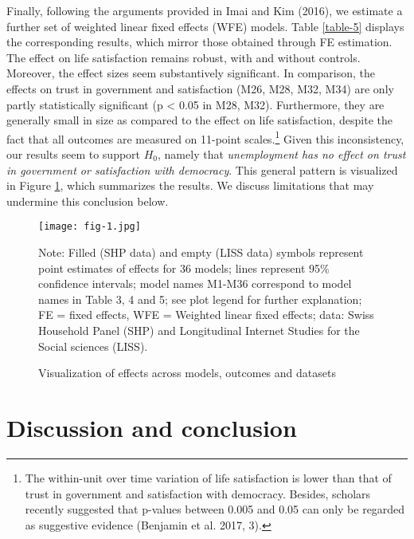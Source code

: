 \documentclass[12pt,]{article}
\let\rmarkdownfootnote\footnote%
\def\footnote{\protect\rmarkdownfootnote}
\begin{document}




Finally, following the arguments provided in Imai and Kim (2016), we estimate a further set of weighted linear fixed effects (WFE) models. Table \ref{table-5} displays the corresponding results, which mirror those obtained through FE estimation. The effect on life satisfaction remains robust, with and without controls. Moreover, the effect sizes seem substantively significant. In comparison, the effects on trust in government and satisfaction (M26, M28, M32, M34) are only partly statistically significant (p \textless{} 0.05 in M28, M32). Furthermore, they are generally small in size as compared to the effect on life satisfaction, despite the fact that all outcomes are measured on 11-point scales.\footnote{The within-unit over time variation of life satisfaction is lower than that of trust in government and satisfaction with democracy. Besides, scholars recently suggested that p-values between 0.005 and 0.05 can only be regarded as suggestive evidence (Benjamin et al. 2017, 3).} Given this inconsistency, our results seem to support \(H_{0}\), namely that \emph{unemployment has no effect on trust in government or satisfaction with democracy}. This general pattern is visualized in Figure \ref{fig-results}, which summarizes the results. We discuss limitations that may undermine this conclusion below.

\begin{figure}[h]
\centering
\caption{Visualization of effects across models, outcomes and datasets}\label{fig-results}
        \texttt{[image: fig-1.jpg]}
\begin{flushleft}
\scriptsize Note: Filled (SHP data) and empty (LISS data) symbols represent point estimates of effects for 36 models; lines represent 95\% confidence intervals;  model names M1-M36 correspond to model names in Table 3, 4 and 5; see plot legend for further explanation; FE = fixed effects, WFE = Weighted linear fixed effects; data: Swiss Household Panel (SHP) and Longitudinal Internet Studies for the Social sciences (LISS).
\end{flushleft}
\end{figure}

\hypertarget{sec:conclusion}{%
\section{Discussion and conclusion}\label{sec:conclusion}}
\end{document}
